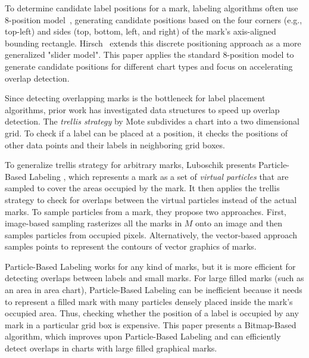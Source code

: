 To determine candidate label positions for a mark, labeling algorithms often use 8-position model~\cite{imhof1975positioning}, generating candidate positions based on the four corners (e.g., top-left) and sides (top, bottom, left, and right) of the mark's axis-aligned bounding rectangle.
Hirsch~\cite{hirsch1982algorithm} extends this discrete positioning approach as a more generalized "slider model".
This paper applies the standard 8-position model to generate candidate positions for different chart types 
and focus on accelerating overlap detection.

Since detecting overlapping marks is the bottleneck for label placement algorithms, prior work has investigated
data structures to speed up overlap detection.
The \emph{trellis strategy} by Mote \ea \cite{mote:informed-greedy} subdivides a chart into a two dimensional grid.
To check if a label can be placed at a position, it checks the positions of other data points and their labels in neighboring grid boxes.

To generalize trellis strategy for arbitrary marks, Luboschik \ea presents Particle-Based Labeling \cite{luboschik:particle}, 
which represents a mark as a set of \emph{virtual particles} that are sampled to cover the areas occupied by the mark.
It then applies the trellis strategy to check for overlaps between the virtual particles instead of the actual marks.
To sample particles from a mark, they propose two approaches. 
First, image-based sampling rasterizes all the marks in $M$ onto an image and then samples particles 
from occupied pixels. 
Alternatively, the vector-based approach samples points to represent the contours of vector graphics of marks.

Particle-Based Labeling works for any kind of marks, but it is more efficient for detecting overlaps between labels and small marks. %
For large filled marks (such as an area in area chart), Particle-Based Labeling can be inefficient 
because it needs to represent a filled mark with many particles densely placed inside the mark's occupied area.
Thus, checking whether the position of a label is occupied by any mark in a particular grid box is expensive.
This paper presents a Bitmap-Based algorithm, which improves upon Particle-Based Labeling and can efficiently detect overlaps in charts with large filled graphical marks.
